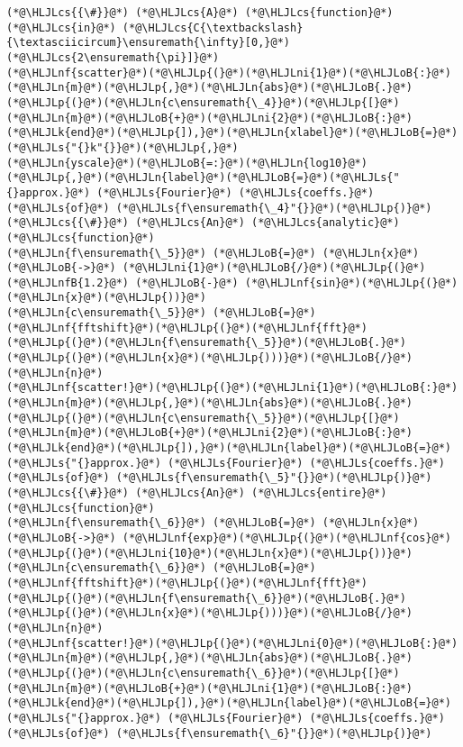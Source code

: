 \documentclass[12pt,landscape]{article}
\newcommand{\HLJLk}[1]{\textcolor[RGB]{148,91,176}{\textbf{#1}}}
\newcommand{\HLJLn}[1]{#1}
\newcommand{\HLJLnf}[1]{\textcolor[RGB]{66,102,213}{#1}}
\newcommand{\HLJLs}[1]{\textcolor[RGB]{201,61,57}{#1}}
\newcommand{\HLJLnfB}[1]{\textcolor[RGB]{59,151,46}{#1}}
\newcommand{\HLJLni}[1]{\textcolor[RGB]{59,151,46}{#1}}
\newcommand{\HLJLoB}[1]{\textcolor[RGB]{102,102,102}{\textbf{#1}}}
\newcommand{\HLJLp}[1]{#1}
\newcommand{\HLJLcs}[1]{\textcolor[RGB]{153,153,119}{\textit{#1}}}
\begin{document}
{\begin{lstlisting}
(*@\HLJLcs{{\#}}@*) (*@\HLJLcs{A}@*) (*@\HLJLcs{function}@*) (*@\HLJLcs{in}@*) (*@\HLJLcs{C{\textbackslash}{\textasciicircum}\ensuremath{\infty}[0,}@*) (*@\HLJLcs{2\ensuremath{\pi}]}@*)
(*@\HLJLnf{scatter}@*)(*@\HLJLp{(}@*)(*@\HLJLni{1}@*)(*@\HLJLoB{:}@*)(*@\HLJLn{m}@*)(*@\HLJLp{,}@*)(*@\HLJLn{abs}@*)(*@\HLJLoB{.}@*)(*@\HLJLp{(}@*)(*@\HLJLn{c\ensuremath{\_4}}@*)(*@\HLJLp{[}@*)(*@\HLJLn{m}@*)(*@\HLJLoB{+}@*)(*@\HLJLni{2}@*)(*@\HLJLoB{:}@*)(*@\HLJLk{end}@*)(*@\HLJLp{]),}@*)(*@\HLJLn{xlabel}@*)(*@\HLJLoB{=}@*)(*@\HLJLs{"{}k"{}}@*)(*@\HLJLp{,}@*)
(*@\HLJLn{yscale}@*)(*@\HLJLoB{=:}@*)(*@\HLJLn{log10}@*)(*@\HLJLp{,}@*)(*@\HLJLn{label}@*)(*@\HLJLoB{=}@*)(*@\HLJLs{"{}approx.}@*) (*@\HLJLs{Fourier}@*) (*@\HLJLs{coeffs.}@*) (*@\HLJLs{of}@*) (*@\HLJLs{f\ensuremath{\_4}"{}}@*)(*@\HLJLp{)}@*)
(*@\HLJLcs{{\#}}@*) (*@\HLJLcs{An}@*) (*@\HLJLcs{analytic}@*) (*@\HLJLcs{function}@*)
(*@\HLJLn{f\ensuremath{\_5}}@*) (*@\HLJLoB{=}@*) (*@\HLJLn{x}@*) (*@\HLJLoB{->}@*) (*@\HLJLni{1}@*)(*@\HLJLoB{/}@*)(*@\HLJLp{(}@*)(*@\HLJLnfB{1.2}@*) (*@\HLJLoB{-}@*) (*@\HLJLnf{sin}@*)(*@\HLJLp{(}@*)(*@\HLJLn{x}@*)(*@\HLJLp{))}@*)
(*@\HLJLn{c\ensuremath{\_5}}@*) (*@\HLJLoB{=}@*) (*@\HLJLnf{fftshift}@*)(*@\HLJLp{(}@*)(*@\HLJLnf{fft}@*)(*@\HLJLp{(}@*)(*@\HLJLn{f\ensuremath{\_5}}@*)(*@\HLJLoB{.}@*)(*@\HLJLp{(}@*)(*@\HLJLn{x}@*)(*@\HLJLp{)))}@*)(*@\HLJLoB{/}@*)(*@\HLJLn{n}@*)
(*@\HLJLnf{scatter!}@*)(*@\HLJLp{(}@*)(*@\HLJLni{1}@*)(*@\HLJLoB{:}@*)(*@\HLJLn{m}@*)(*@\HLJLp{,}@*)(*@\HLJLn{abs}@*)(*@\HLJLoB{.}@*)(*@\HLJLp{(}@*)(*@\HLJLn{c\ensuremath{\_5}}@*)(*@\HLJLp{[}@*)(*@\HLJLn{m}@*)(*@\HLJLoB{+}@*)(*@\HLJLni{2}@*)(*@\HLJLoB{:}@*)(*@\HLJLk{end}@*)(*@\HLJLp{]),}@*)(*@\HLJLn{label}@*)(*@\HLJLoB{=}@*)(*@\HLJLs{"{}approx.}@*) (*@\HLJLs{Fourier}@*) (*@\HLJLs{coeffs.}@*) (*@\HLJLs{of}@*) (*@\HLJLs{f\ensuremath{\_5}"{}}@*)(*@\HLJLp{)}@*)
(*@\HLJLcs{{\#}}@*) (*@\HLJLcs{An}@*) (*@\HLJLcs{entire}@*) (*@\HLJLcs{function}@*)
(*@\HLJLn{f\ensuremath{\_6}}@*) (*@\HLJLoB{=}@*) (*@\HLJLn{x}@*) (*@\HLJLoB{->}@*) (*@\HLJLnf{exp}@*)(*@\HLJLp{(}@*)(*@\HLJLnf{cos}@*)(*@\HLJLp{(}@*)(*@\HLJLni{10}@*)(*@\HLJLn{x}@*)(*@\HLJLp{))}@*)
(*@\HLJLn{c\ensuremath{\_6}}@*) (*@\HLJLoB{=}@*) (*@\HLJLnf{fftshift}@*)(*@\HLJLp{(}@*)(*@\HLJLnf{fft}@*)(*@\HLJLp{(}@*)(*@\HLJLn{f\ensuremath{\_6}}@*)(*@\HLJLoB{.}@*)(*@\HLJLp{(}@*)(*@\HLJLn{x}@*)(*@\HLJLp{)))}@*)(*@\HLJLoB{/}@*)(*@\HLJLn{n}@*)
(*@\HLJLnf{scatter!}@*)(*@\HLJLp{(}@*)(*@\HLJLni{0}@*)(*@\HLJLoB{:}@*)(*@\HLJLn{m}@*)(*@\HLJLp{,}@*)(*@\HLJLn{abs}@*)(*@\HLJLoB{.}@*)(*@\HLJLp{(}@*)(*@\HLJLn{c\ensuremath{\_6}}@*)(*@\HLJLp{[}@*)(*@\HLJLn{m}@*)(*@\HLJLoB{+}@*)(*@\HLJLni{1}@*)(*@\HLJLoB{:}@*)(*@\HLJLk{end}@*)(*@\HLJLp{]),}@*)(*@\HLJLn{label}@*)(*@\HLJLoB{=}@*)(*@\HLJLs{"{}approx.}@*) (*@\HLJLs{Fourier}@*) (*@\HLJLs{coeffs.}@*) (*@\HLJLs{of}@*) (*@\HLJLs{f\ensuremath{\_6}"{}}@*)(*@\HLJLp{)}@*)
\end{lstlisting}

}
\end{document}
